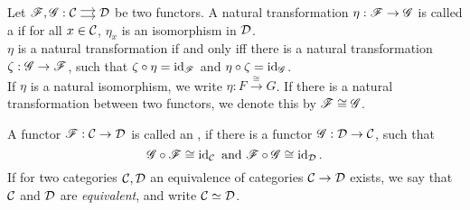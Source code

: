 \begin{defn}
  Let $\ffunc,\gfunc:\begin{tikzcd}[cramped, sep=small]\ccat\ar[shift left]{r}\ar[shift right]{r}&\dcat\end{tikzcd}$ be two functors. A natural transformation $\eta:\mathscr{F} \to \mathscr{G}$ is called a  if for all $x\in \mathcal{C}$, $\eta_x$ is an isomorphism in $\mathcal{D}$.\\
  $\eta$ is a natural transformation if and only iff there is a natural transformation $\zeta:\mathscr{G}\to \mathscr{F}$, such that $\zeta\circ \eta=\operatorname{id}_{\mathscr{F}}$ and $\eta\circ \zeta = \operatorname{id}_{\mathscr{G}}$.\\
  If $\eta$ is a natural isomorphism, we write $\eta: F\xrightarrow{\cong}G$. If there is a natural transformation between two functors, we denote this by $\mathscr{F} \cong \mathscr{G}$.
\end{defn}
\begin{defn}
  A functor $\mathscr{F}:\mathcal{C}\to \mathcal{D}$ is called an , if there is a functor $\mathscr{G}:\mathcal{D}\to \mathcal{C}$, such that
  \[
  \mathscr{G}\circ\mathscr{F} \cong \operatorname{id}_{\mathcal{C}}\text{ and }\mathscr{F} \circ \mathscr{G} \cong \operatorname{id}_{\mathcal{D}}.
  \]
  If for two categories $\mathcal{C},\mathcal{D}$ an equivalence of categories $\mathcal{C}\to\mathcal{D}$ exists, we say that $\mathcal{C}$ and $\mathcal{D}$ are \emph{equivalent}, and write $\mathcal{C} \simeq \mathcal{D}$.
\end{defn}
